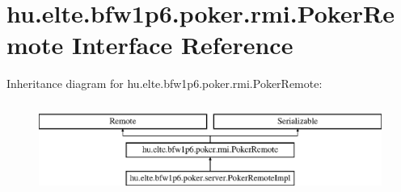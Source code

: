 \hypertarget{interfacehu_1_1elte_1_1bfw1p6_1_1poker_1_1rmi_1_1_poker_remote}{}\section{hu.\+elte.\+bfw1p6.\+poker.\+rmi.\+Poker\+Remote Interface Reference}
\label{interfacehu_1_1elte_1_1bfw1p6_1_1poker_1_1rmi_1_1_poker_remote}
Inheritance diagram for hu.\+elte.\+bfw1p6.\+poker.\+rmi.\+Poker\+Remote\+:\begin{figure}[H]
\begin{center}
\leavevmode
\includegraphics[height=3.000000cm]{interfacehu_1_1elte_1_1bfw1p6_1_1poker_1_1rmi_1_1_poker_remote}
\end{center}
\end{figure}
